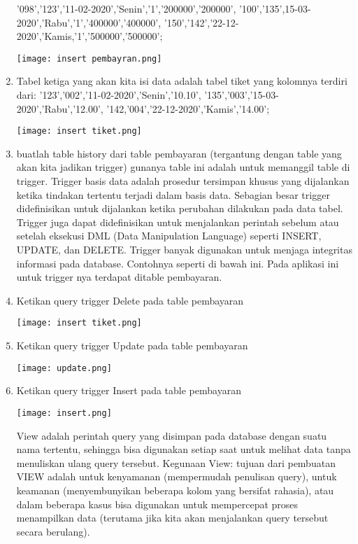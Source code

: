 \documentclass{article}
\begin{document}
\begin{enumerate}
    '098','123','11-02-2020','Senin','1','200000','200000',
    '100','135',15-03-2020','Rabu','1','400000','400000',
    '150','142','22-12-2020','Kamis,'1','500000','500000';
    \begin{center}
    \texttt{[image: insert pembayran.png]}
    \end{center}
    \item Tabel ketiga yang akan kita isi data adalah tabel tiket yang kolomnya terdiri dari: 
    '123','002','11-02-2020','Senin','10.10',
    '135','003','15-03-2020','Rabu','12.00',
    '142,'004','22-12-2020','Kamis','14.00';
    \begin{center}
    \texttt{[image: insert tiket.png]}
    \end{center}
    \item buatlah table history dari table pembayaran (tergantung dengan table yang akan kita jadikan trigger) gunanya table ini adalah untuk memanggil table di trigger.
    Trigger basis data adalah prosedur tersimpan khusus yang dijalankan ketika tindakan tertentu terjadi dalam basis data. Sebagian besar trigger didefinisikan untuk dijalankan ketika perubahan dilakukan pada data tabel. Trigger juga dapat didefinisikan untuk menjalankan perintah sebelum atau setelah eksekusi DML (Data Manipulation Language) seperti INSERT, UPDATE, dan DELETE. Trigger banyak digunakan untuk menjaga integritas informasi pada database. Contohnya seperti di bawah ini. Pada aplikasi ini untuk trigger nya terdapat ditable pembayaran.
    \item Ketikan query trigger Delete pada table pembayaran
     \begin{center}
    \texttt{[image: insert tiket.png]}
    \end{center}
    \item Ketikan query trigger Update pada table pembayaran
     \begin{center}
    \texttt{[image: update.png]}
    \end{center}
    \item Ketikan query trigger Insert pada table pembayaran
     \begin{center}
    \texttt{[image: insert.png]}
    \end{center}
    View adalah perintah query yang disimpan pada database dengan suatu nama tertentu, sehingga bisa digunakan setiap saat untuk melihat data tanpa menuliskan ulang query tersebut.
    Kegunaan View:
    tujuan dari pembuatan VIEW adalah untuk kenyamanan (mempermudah penulisan query), untuk keamanan (menyembunyikan beberapa kolom yang bersifat rahasia), atau dalam beberapa kasus bisa digunakan untuk mempercepat proses menampilkan data (terutama jika kita akan menjalankan query tersebut secara berulang).
    \end{enumerate}
\end{document}

